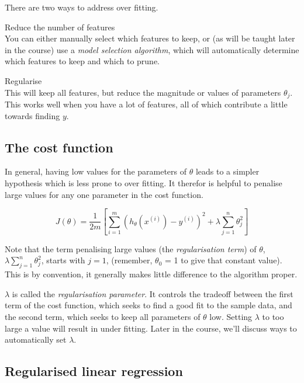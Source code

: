 There are two ways to address over fitting.
\begin{description}
\item{Reduce the number of features} \hfill\\ You can either manually select which features to keep, or (as will be taught later in the course) use a \emph{model selection algorithm}, which will automatically determine which features to keep and which to prune.
\item{Regularise} \hfill\\ This will keep all features, but reduce the magnitude or values of parameters $\theta_j$. This works well when you have a lot of features, all of which contribute a little towards finding $y$.
\end{description}

\subsection{The cost function}

In general, having low values for the parameters of $\theta$ leads to a simpler hypothesis which is less prone to over fitting. It therefor is helpful to penalise large values for any one parameter in the cost function.

\begin{equation}
J(\theta) = \frac{1}{2m}[\sum^m_{i = 1}
(h_\theta(x^{(i)}) - y^{(i)})^2 +
\lambda \sum^n_{j = 1}\theta^2_j]
\end{equation}

Note that the term penalising large values (the \emph{regularisation term}) of $\theta$, $\lambda \sum^n_{j = 1}\theta^2_j$, starts with $ j = 1 $, (remember, $\theta_0$ = 1 to give that constant value). This is by convention, it generally makes little difference to the algorithm proper.

$\lambda$ is called the \emph{regularisation parameter}. It controls the tradeoff between the first term of the cost function, which seeks to find a good fit to the sample data, and the second term, which seeks to keep all parameters of $\theta$ low. Setting $\lambda$ to too large a value will result in under fitting. Later in the course, we'll discuss ways to automatically set $\lambda$.

\subsection{Regularised linear regression}

